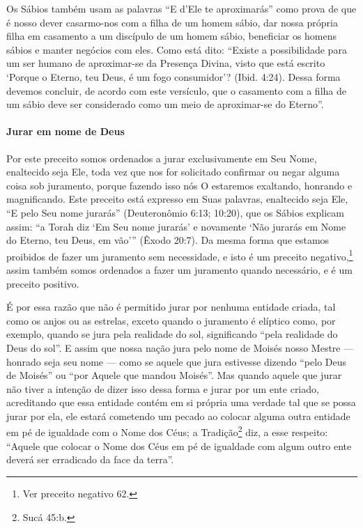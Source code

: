 Os Sábios também usam as palavras ``E d'Ele te aproximarás'' como prova
de que é nosso dever casarmo-nos com a filha de um homem sábio, dar
nossa própria filha em casamento a um discípulo de um homem sábio,
beneficiar os homens sábios e manter negócios com eles. Como está dito:
``Existe a possibilidade para um ser humano de aproximar-se da Presença
Divina, visto que está escrito `Porque o Eterno, teu Deus, é um fogo
consumidor'? (Ibid. 4:24). Dessa forma devemos concluir, de acordo com
este versículo, que o casamento com a filha de um sábio deve ser
considerado como um meio de aproximar-se do Eterno''.

\paragraph{Jurar em nome de Deus}

Por este preceito somos ordenados a jurar exclusivamente em Seu Nome,
enaltecido seja Ele, toda vez que nos for solicitado confirmar ou negar
alguma coisa sob juramento, porque fazendo isso nós O estaremos
exaltando, honrando e magnificando. Este preceito está expresso em Suas
palavras, enaltecido seja Ele, ``E pelo Seu nome jurarás''
(Deuteronômio 6:13; 10:20), que os Sábios explicam assim: ``a Torah diz
`Em Seu nome jurarás' e novamente `Não jurarás em Nome do Eterno, teu
Deus, em vão''' (Êxodo 20:7). Da mesma forma que estamos proibidos de
fazer um juramento sem necessidade, e isto é um preceito
negativo,\footnote{Ver preceito negativo 62.} assim também somos ordenados a fazer um
juramento quando necessário, e é um preceito positivo.

É por essa razão que não é permitido jurar por nenhuma entidade criada,
tal como os anjos ou as estrelas, exceto quando o juramento é elíptico
como, por exemplo, quando se jura pela realidade do sol, significando
``pela realidade do Deus do sol''. E assim que nossa nação jura pelo
nome de Moisés nosso Mestre --- honrado seja seu nome --- como se aquele
que jura estivesse dizendo ``pelo Deus de Moisés'' ou ``por Aquele que
mandou Moisés''. Mas quando aquele que jurar não tiver a intenção de
dizer isso dessa forma e jurar por um ente criado, acreditando que essa
entidade contém em si própria uma verdade tal que se possa jurar por
ela, ele estará cometendo um pecado ao colocar alguma outra entidade em
pé de igualdade com o Nome dos Céus; a Tradição\footnote{Sucá 45:b.}
diz, a esse respeito: ``Aquele que colocar o Nome dos Céus em pé de
igualdade com algum outro ente deverá ser erradicado da face da terra''.

